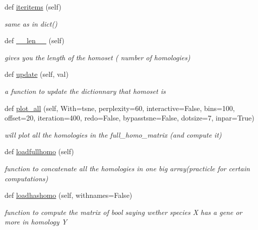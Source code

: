 \begin{DoxyCompactItemize}
def \mbox{\hyperlink{class_py_c_u_b_1_1homoset_1_1_homo_set_aefca94ad0e64bcad582edcc163bc21ad}{iteritems}} (self)
\begin{DoxyCompactList}\small\item\em same as in dict() \end{DoxyCompactList}\item 
\mbox{\label{class_py_c_u_b_1_1homoset_1_1_homo_set_ada72dc2741d84a8c617dc23449154fc2}} 
def \mbox{\hyperlink{class_py_c_u_b_1_1homoset_1_1_homo_set_ada72dc2741d84a8c617dc23449154fc2}{\+\_\+\+\_\+len\+\_\+\+\_\+}} (self)
\begin{DoxyCompactList}\small\item\em gives you the length of the homoset ( number of homologies) \end{DoxyCompactList}\item 
def \mbox{\hyperlink{class_py_c_u_b_1_1homoset_1_1_homo_set_a8cf76800f047841bf63d507fb1b54048}{update}} (self, val)
\begin{DoxyCompactList}\small\item\em a function to update the dictionnary that homoset is \end{DoxyCompactList}\item 
def \mbox{\hyperlink{class_py_c_u_b_1_1homoset_1_1_homo_set_af57de86adab3635645d684b89636cd5c}{plot\+\_\+all}} (self, With=\textquotesingle{}tsne\textquotesingle{}, perplexity=60, interactive=False, bins=100, offset=20, iteration=400, redo=False, bypasstsne=False, dotsize=7, inpar=True)
\begin{DoxyCompactList}\small\item\em will plot all the homologies in the full\+\_\+homo\+\_\+matrix (and compute it) \end{DoxyCompactList}\item 
def \mbox{\hyperlink{class_py_c_u_b_1_1homoset_1_1_homo_set_a5029dbdf4e7f61bd38b6273f4fde9ead}{loadfullhomo}} (self)
\begin{DoxyCompactList}\small\item\em function to concatenate all the homologies in one big array(practicle for certain computations) \end{DoxyCompactList}\item 
def \mbox{\hyperlink{class_py_c_u_b_1_1homoset_1_1_homo_set_a5a56a99b5bf87afb418a1bbc5ec1c10b}{loadhashomo}} (self, withnames=False)
\begin{DoxyCompactList}\small\item\em function to compute the matrix of bool saying wether species X has a gene or more in homology Y \end{DoxyCompactList}\item 

\end{DoxyCompactItemize}
